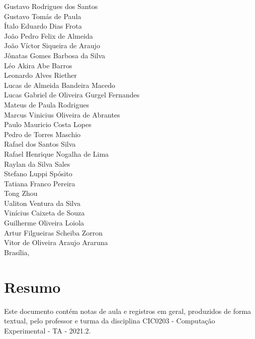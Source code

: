 \documentclass[12pt]{book}
\begin{document}
\begin{titlepage}
\begin{center}
	Gustavo Rodrigues dos Santos \\
	Gustavo Tomás de Paula\\
	Ítalo Eduardo Dias Frota\\
	João Pedro Felix de Almeida\\
	João Víctor Siqueira de Araujo\\
	Jônatas Gomes Barbosa da Silva\\
	Léo Akira Abe Barros\\
	Leonardo Alves Riether\\
	Lucas de Almeida Bandeira Macedo\\
	Lucas Gabriel de Oliveira Gurgel Fernandes \\
	Mateus de Paula Rodrigues\\
	Marcus Vinicius Oliveira de Abrantes\\
	Paulo Mauricio Costa Lopes\\
	Pedro de Torres Maschio\\
	Rafael dos Santos Silva\\
	Rafael Henrique Nogalha de Lima\\
	Raylan da Silva Sales\\
	Stefano Luppi Spósito\\
	Tatiana Franco Pereira\\
	Tong Zhou\\
	Ualiton Ventura da Silva\\
	Vinícius Caixeta de Souza\\
	Guilherme Oliveira Loiola\\
	Artur Filgueiras Scheiba Zorron\\
	Vitor de Oliveira Araujo Araruna \\
	\vspace{1.5cm}
	{\large Brasília, \DTMnow}
\end{center}
\end{titlepage}
	\printnoidxglossary
	\tableofcontents
	\listoffigures
	\listoftables
	\clearpage
{}

\pagestyle{fancy}

	\chapter*{Resumo}

	Este documento contém notas de aula e registros em geral, produzidos de forma textual, pelo professor e turma da disciplina CIC0203 - Computação Experimental - TA - 2021.2.
	
\end{document}
